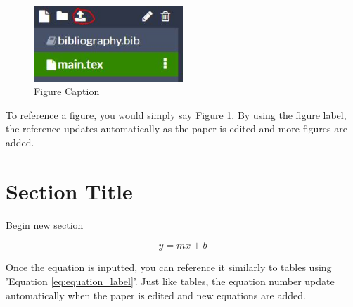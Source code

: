 \documentclass{article}
\begin{document}
\begin{doublespacing}
\begin{figure}[h] %
    \centering
    \includegraphics[width=0.5\textwidth]{Images/upload_image.JPG} %
    \caption{Figure Caption} %
    \label{fig:label_of_figure} %
\end{figure}

\par To reference a figure, you would simply say Figure \ref{fig:label_of_figure}. By using the figure label, the reference updates automatically as the paper is edited and more figures are added.


\section{Section Title}

\noindent Begin new section



\begin{equation} 
    y=mx+b
    \label{eq:equation_label}
\end{equation}

\par Once the equation is inputted, you can reference it similarly to tables using 'Equation \ref{eq:equation_label}'. Just like tables, the equation number update automatically when the paper is edited and new equations are added. 


\end{doublespacing}
\end{document}
